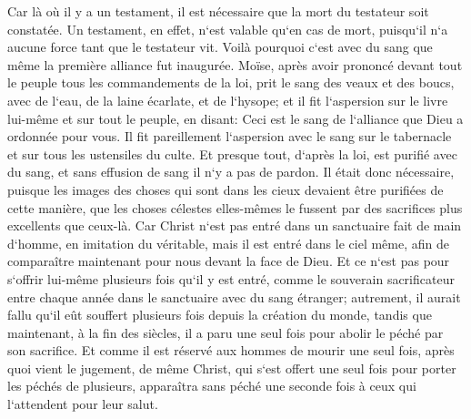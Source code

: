\verse Car là où il y a un testament, il est nécessaire que la mort du testateur soit constatée. 
\verse Un testament, en effet, n`est valable qu`en cas de mort, puisqu`il n`a aucune force tant que le testateur vit. 
\verse Voilà pourquoi c`est avec du sang que même la première alliance fut inaugurée. 
\verse Moïse, après avoir prononcé devant tout le peuple tous les commandements de la loi, prit le sang des veaux et des boucs, avec de l`eau, de la laine écarlate, et de l`hysope; et il fit l`aspersion sur le livre lui-même et sur tout le peuple, en disant: 
\verse Ceci est le sang de l`alliance que Dieu a ordonnée pour vous. 
\verse Il fit pareillement l`aspersion avec le sang sur le tabernacle et sur tous les ustensiles du culte. 
\verse Et presque tout, d`après la loi, est purifié avec du sang, et sans effusion de sang il n`y a pas de pardon. 
\verse Il était donc nécessaire, puisque les images des choses qui sont dans les cieux devaient être purifiées de cette manière, que les choses célestes elles-mêmes le fussent par des sacrifices plus excellents que ceux-là. 
\verse Car Christ n`est pas entré dans un sanctuaire fait de main d`homme, en imitation du véritable, mais il est entré dans le ciel même, afin de comparaître maintenant pour nous devant la face de Dieu. 
\verse Et ce n`est pas pour s`offrir lui-même plusieurs fois qu`il y est entré, comme le souverain sacrificateur entre chaque année dans le sanctuaire avec du sang étranger; 
\verse autrement, il aurait fallu qu`il eût souffert plusieurs fois depuis la création du monde, tandis que maintenant, à la fin des siècles, il a paru une seul fois pour abolir le péché par son sacrifice. 
\verse Et comme il est réservé aux hommes de mourir une seul fois, après quoi vient le jugement, 
\verse de même Christ, qui s`est offert une seul fois pour porter les péchés de plusieurs, apparaîtra sans péché une seconde fois à ceux qui l`attendent pour leur salut. 


